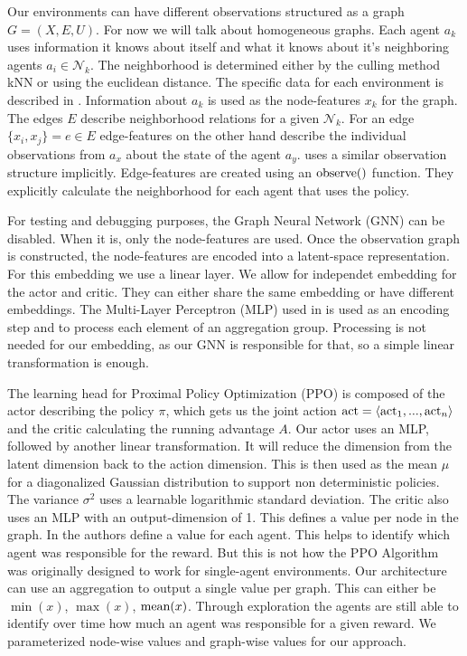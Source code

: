 Our environments can have different observations structured as a graph $G = (X,E,U)$. For now we will talk about homogeneous graphs. Each agent $a_k$ uses information it knows about itself and what it knows about it's neighboring agents $a_i \in \mathcal{N}_k$. The neighborhood is determined either by the culling method kNN or using the euclidean distance. The specific data for each environment is described in . Information about $a_k$ is used as the node-features $x_k$ for the graph. The edges $E$ describe neighborhood relations for a given $\mathcal{N}_k$. For an edge $\{x_i,x_j\} = e \in E$ edge-features on the other hand describe the individual observations from $a_x$ about the state of the agent $a_y$.  uses a similar observation structure implicitly. Edge-features are created using an $\textup{observe()}$ function. They explicitly calculate the neighborhood for each agent that uses the policy. \par

For testing and debugging purposes, the Graph Neural Network (GNN) can be disabled. When it is, only the node-features are used. Once the observation graph is constructed, the node-features are encoded into a latent-space representation. For this embedding we use a linear layer. We allow for independet embedding for the actor and critic. They can either share the same embedding or have different embeddings. The Multi-Layer Perceptron (MLP) used in  is used as an encoding step and to process each element of an aggregation group. Processing is not needed for our embedding, as our GNN is responsible for that, so a simple linear transformation is enough.\par

The learning head for Proximal Policy Optimization (PPO) is composed of the actor describing the policy $\pi$, which gets us the joint action $\textup{act} = \langle \textup{act}_1,...,\textup{act}_n \rangle$ and the critic calculating the running advantage $A$. Our actor uses an MLP, followed by another linear transformation. It will reduce the dimension from the latent dimension back to the action dimension. This is then used as the mean $\mu$ for a diagonalized Gaussian distribution to support non deterministic policies. The variance $\sigma^2$ uses a learnable logarithmic standard deviation. The critic also uses an MLP with an output-dimension of 1. This defines a value per node in the graph. In  the authors define a value for each agent. This helps to identify which agent was responsible for the reward. But this is not how the PPO Algorithm was originally designed to work for single-agent environments. Our architecture can use an aggregation to output a single value per graph. This can either be $\min(x)$, $\max(x)$, $\textup{mean}(x)$. Through exploration the agents are still able to identify over time how much an agent was responsible for a given reward. We parameterized node-wise values and graph-wise values for our approach. \par



